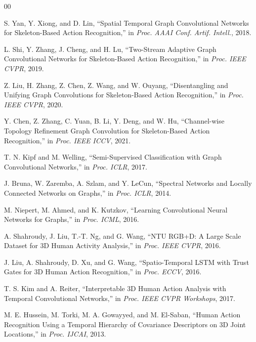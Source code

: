 \documentclass[conference]{IEEEtran}
\begin{document}
\begin{thebibliography}{00}

S. Yan, Y. Xiong, and D. Lin,
``Spatial Temporal Graph Convolutional Networks for Skeleton-Based
Action Recognition,''
in \textit{Proc. AAAI Conf. Artif. Intell.}, 2018.

L. Shi, Y. Zhang, J. Cheng, and H. Lu,
``Two-Stream Adaptive Graph Convolutional Networks for Skeleton-Based
Action Recognition,''
in \textit{Proc. IEEE CVPR}, 2019.

Z. Liu, H. Zhang, Z. Chen, Z. Wang, and W. Ouyang,
``Disentangling and Unifying Graph Convolutions for Skeleton-Based
Action Recognition,''
in \textit{Proc. IEEE CVPR}, 2020.

Y. Chen, Z. Zhang, C. Yuan, B. Li, Y. Deng, and W. Hu,
``Channel-wise Topology Refinement Graph Convolution for Skeleton-Based
Action Recognition,''
in \textit{Proc. IEEE ICCV}, 2021.

T. N. Kipf and M. Welling,
``Semi-Supervised Classification with Graph Convolutional Networks,''
in \textit{Proc. ICLR}, 2017.

J. Bruna, W. Zaremba, A. Szlam, and Y. LeCun,
``Spectral Networks and Locally Connected Networks on Graphs,''
in \textit{Proc. ICLR}, 2014.

M. Niepert, M. Ahmed, and K. Kutzkov,
``Learning Convolutional Neural Networks for Graphs,''
in \textit{Proc. ICML}, 2016.

A. Shahroudy, J. Liu, T.-T. Ng, and G. Wang,
``NTU RGB+D: A Large Scale Dataset for 3D Human Activity Analysis,''
in \textit{Proc. IEEE CVPR}, 2016.

J. Liu, A. Shahroudy, D. Xu, and G. Wang,
``Spatio-Temporal LSTM with Trust Gates for 3D Human Action Recognition,''
in \textit{Proc. ECCV}, 2016.

T. S. Kim and A. Reiter,
``Interpretable 3D Human Action Analysis with Temporal Convolutional
Networks,''
in \textit{Proc. IEEE CVPR Workshops}, 2017.

M. E. Hussein, M. Torki, M. A. Gowayyed, and M. El-Saban,
``Human Action Recognition Using a Temporal Hierarchy of Covariance
Descriptors on 3D Joint Locations,''
in \textit{Proc. IJCAI}, 2013.


\end{thebibliography}
\end{document}
